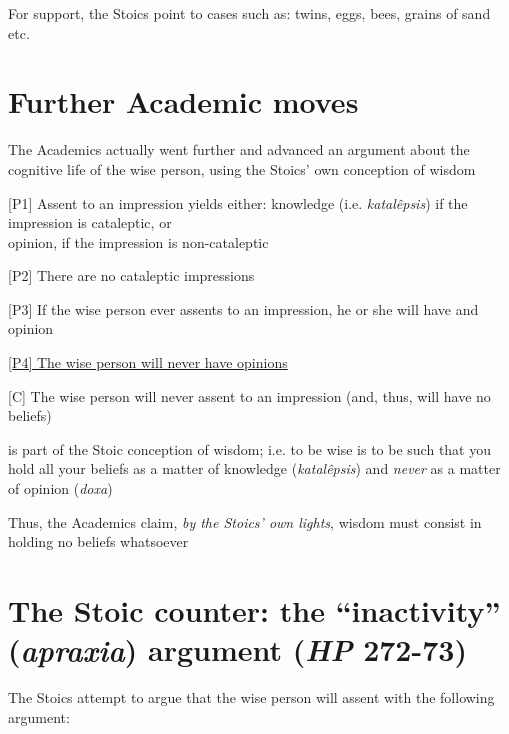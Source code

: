 \documentclass[11pt]{article}
\begin{document}
\noindent For support, the Stoics point to cases such as: twins, eggs, bees, grains of sand etc.
\vspace*{2mm}

\section*{Further Academic moves}

\noindent The Academics actually went further and advanced an argument about the cognitive life of the wise person, using the Stoics' own conception of wisdom
\vspace*{2mm}

[P1] Assent to an impression yields either: knowledge (i.e. \emph{katal\^{e}psis}) if the impression is cataleptic, or\\\hspace*{13mm}opinion, if the impression is non-cataleptic
\vspace*{1mm}

[P2] There are no cataleptic impressions
\vspace*{1mm}

[P3] If the wise person ever assents to an impression, he or she will have and opinion
\vspace*{1mm}

\underline{[P4] The wise person will never have opinions}
\vspace*{1mm}

[C] The wise person will never assent to an impression (and, thus, will have no beliefs)
\vspace*{2mm}

\noindent [P4] is part of the Stoic conception of wisdom; i.e. to be wise is to be such that you hold all your beliefs as a matter of knowledge (\emph{katal\^{e}psis}) and \emph{never} as a matter of opinion (\emph{doxa})
\vspace*{2mm}

\noindent Thus, the Academics claim, \emph{by the Stoics' own lights}, wisdom must consist in holding no beliefs whatsoever

\section*{The Stoic counter: the ``inactivity'' (\emph{apraxia}) argument (\emph{HP} 272-73)}

\noindent The Stoics attempt to argue that the wise person will assent with the following argument:
\vspace*{2mm}
\end{document}
